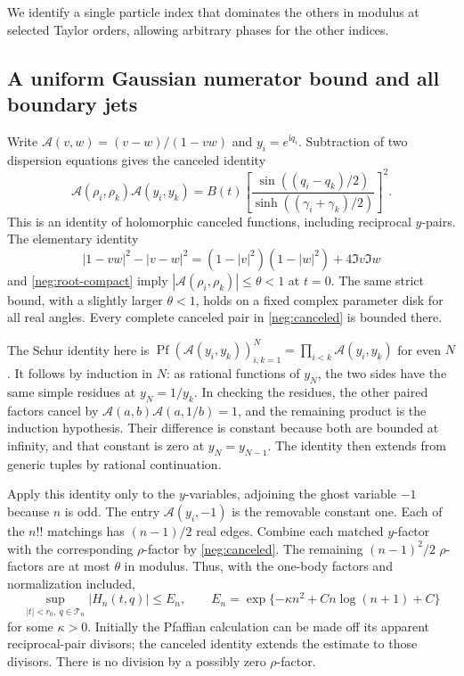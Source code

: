 \documentclass[11pt]{article}
\numberwithin{equation}{section}
\theoremstyle{definition}
\newcommand{\ii}{\mathrm i}
\begin{document}
We identify a single particle index that dominates the others in
modulus at selected Taylor orders, allowing arbitrary phases for
the other indices.

\subsection{A uniform Gaussian numerator bound and all boundary jets}
\label{neg:jets-section}

Write \(\mathcal A(v,w)=(v-w)/(1-vw)\) and \(y_i=e^{\ii q_i}\).
Subtraction of two dispersion equations gives the canceled identity
\begin{equation}
 \mathcal A(\rho_i,\rho_k)\mathcal A(y_i,y_k)
 =B(t)\left[
    \frac{\sin((q_i-q_k)/2)}
         {\sinh((\gamma_i+\gamma_k)/2)}
       \right]^2 .
 \label{neg:canceled}
\end{equation}
This is an identity of holomorphic canceled functions, including
reciprocal \(y\)-pairs.  The elementary identity
\begin{equation}
 |1-vw|^2-|v-w|^2
 =(1-|v|^2)(1-|w|^2)+4\Im v\Im w
 \label{neg:schur}
\end{equation}
and \eqref{neg:root-compact} imply
\(|\mathcal A(\rho_i,\rho_k)|\le\theta<1\) at \(t=0\).
The same strict bound, with a slightly larger \(\theta<1\), holds
on a fixed complex parameter disk for all real angles.  Every
complete canceled pair in \eqref{neg:canceled} is bounded there.

The Schur identity here is
\(\operatorname{Pf}(\mathcal A(y_i,y_k))_{i,k=1}^{N}
=\prod_{i<k}\mathcal A(y_i,y_k)\) for even \(N\).
It follows by induction in \(N\): as rational functions of \(y_N\),
the two sides have the same simple residues at \(y_N=1/y_k\).
In checking the residues, the other paired factors cancel by
\(\mathcal A(a,b)\mathcal A(a,1/b)=1\), and the remaining product
is the induction hypothesis.  Their difference is constant because
both are bounded at infinity, and that constant is zero at
\(y_N=y_{N-1}\).  The identity then extends from generic tuples
by rational continuation.

Apply this identity only to the \(y\)-variables, adjoining the
ghost variable \(-1\) because \(n\) is odd.  The entry
\(\mathcal A(y_i,-1)\) is the removable constant one.
Each of the \(n!!\) matchings has \((n-1)/2\) real edges.
Combine each matched \(y\)-factor with the corresponding
\(\rho\)-factor by \eqref{neg:canceled}.  The remaining
\((n-1)^2/2\) \(\rho\)-factors are at most \(\theta\) in modulus.
Thus, with the one-body factors and normalization included,
\begin{equation}
 \sup_{|t|<r_0,\ q\in\mathcal T_n}|H_n(t,q)|
 \le E_n,\qquad
 E_n=\exp\{-\kappa n^2+C n\log(n+1)+C\}
 \label{neg:gaussian}
\end{equation}
for some \(\kappa>0\).  Initially the Pfaffian calculation can be
made off its apparent reciprocal-pair divisors; the canceled
identity extends the estimate to those divisors.  There is no
division by a possibly zero \(\rho\)-factor.  
\end{document}
